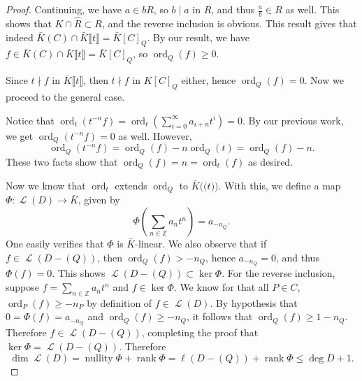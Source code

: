 \documentclass{article}
\newcommand{\llp}{\mathopen{(\!(}}
\newcommand{\rrp}{\mathclose{)\!)}}
\newcommand{\llb}{\llbracket}
\newcommand{\rrb}{\rrbracket}
\theoremstyle{customplain}
\theoremstyle{customdef}
\newcommand{\Z}{\mathbb{Z}}
\DeclareMathOperator{\ord}{ord}
\DeclareMathOperator{\nullity}{\mathrm{nullity}}
\DeclareMathOperator{\rank}{\mathrm{rank}}
\DeclareMathOperator{\calL}{\mathcal{L}}
\theoremstyle{definition} %
\renewcommand{\le}{\leqslant}
\renewcommand{\ge}{\geqslant}
\begin{document}
\begin{proof}
    Continuing, we have $a\in bR$, so $b\mid a$ in $R$, and thus $\frac{a}{b}\in R$ as well. This shows that $K\cap \widehat{R}\subset R$, and the reverse inclusion is obvious. This result gives that indeed $\bar K(C)\cap \bar K\llb t \rrb = \bar K[C]_Q.$ By our result, we have $f\in \bar K(C) \cap \bar K \llb t \rrb = \bar K[C]_Q$, so $\ord_Q(f)\ge 0.$
    
    
    Since $t\nmid f$ in $\bar K\llb t \rrb$, then $t\nmid f$ in $K[C]_Q$ either, hence $\ord_Q(f)=0$. Now we proceed to the general case.
    
    
    Notice that $\ord_t(t^{-n} f)=\ord_t(\sum_{i=0}^\infty a_{i+n} t^i) = 0$. By our previous work, we get $\ord_Q(t^{-n}f)=0$ as well. However,
    \[
    \ord_Q(t^{-n} f) = \ord_Q(f)-n\ord_Q(t)=\ord_Q(f)-n.
    \]
    These two facts show that $\ord_Q(f)=n=\ord_t(f)$ as desired.

    Now we know that $\ord_t$ extends $\ord_Q$ to $\bar K \llp t \rrp.$ With this, we define a map $\Phi: \calL(D)\to \bar K$, given by $$\Phi(\sum_{n\in \Z} a_n t^n) = a_{-n_Q}.$$ One easily verifies that $\Phi$ is $\bar K$-linear. We also observe that if $f\in \calL(D-(Q))$, then $\ord_Q(f)>-n_Q$, hence $a_{-n_Q} = 0$, and thus $\Phi(f)=0.$ This shows $\calL(D-(Q))\subset \ker \Phi.$ For the reverse inclusion, suppose $f=\sum_{n\in \Z} a_n t^n$ and $f\in \ker \Phi$. We know for that all $P\in C$, $\ord_P(f) \ge -n_P$ by definition of $f\in \calL(D).$ By hypothesis that $0=\Phi(f)=a_{-n_Q}$ and $\ord_Q(f) \ge -n_Q$, it follows that $\ord_Q(f)\ge 1-n_Q.$ Therefore $f\in \calL(D-(Q))$, completing the proof that $\ker \Phi = \calL(D-(Q)).$ Therefore
    \[
    \dim \calL(D) = \nullity \Phi + \rank \Phi = \ell(D-(Q))+\rank \Phi \le \deg D + 1.
    \]
    
\end{proof}


\printbibliography
\end{document}
